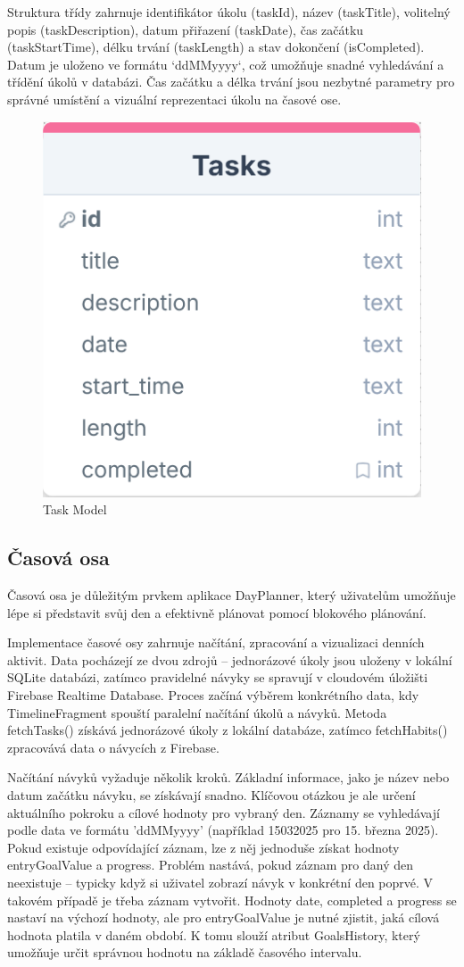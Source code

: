 Struktura třídy zahrnuje identifikátor úkolu (taskId), název (taskTitle), volitelný popis (taskDescription), datum přiřazení (taskDate), čas začátku (taskStartTime), délku trvání (taskLength) a stav dokončení (isCompleted). Datum je uloženo ve formátu `ddMMyyyy`, což umožňuje snadné vyhledávání a třídění úkolů v databázi. Čas začátku a délka trvání jsou nezbytné parametry pro správné umístění a vizuální reprezentaci úkolu na časové ose.  
\begin{figure}[H]
    \centering
    \includegraphics[width=0.4\linewidth]{images/TASK.png}
    \caption{Task Model}
    \label{fig:task-model}
\end{figure}
\newpage
\subsection{Časová osa}
\hspace{14pt} Časová osa je důležitým prvkem aplikace DayPlanner, který uživatelům umožňuje lépe si představit svůj den a efektivně plánovat pomocí blokového plánování.

Implementace časové osy zahrnuje načítání, zpracování a vizualizaci denních aktivit. Data pocházejí ze dvou zdrojů – jednorázové úkoly jsou uloženy v lokální SQLite databázi, zatímco pravidelné návyky se spravují v cloudovém úložišti Firebase Realtime Database. Proces začíná výběrem konkrétního data, kdy TimelineFragment spouští paralelní načítání úkolů a návyků. Metoda fetchTasks() získává jednorázové úkoly z lokální databáze, zatímco fetchHabits() zpracovává data o návycích z Firebase.

Načítání návyků vyžaduje několik kroků. Základní informace, jako je název nebo datum začátku návyku, se získávají snadno. Klíčovou otázkou je ale určení aktuálního pokroku a cílové hodnoty pro vybraný den. Záznamy se vyhledávají podle data ve formátu 'ddMMyyyy' (například 15032025 pro 15. března 2025). Pokud existuje odpovídající záznam, lze z něj jednoduše získat hodnoty entryGoalValue a progress. Problém nastává, pokud záznam pro daný den neexistuje – typicky když si uživatel zobrazí návyk v konkrétní den poprvé. V takovém případě je třeba záznam vytvořit. Hodnoty date, completed a progress se nastaví na výchozí hodnoty, ale pro entryGoalValue je nutné zjistit, jaká cílová hodnota platila v daném období. K tomu slouží atribut GoalsHistory, který umožňuje určit správnou hodnotu na základě časového intervalu.

